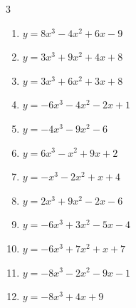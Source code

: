 \begin{multicols}{3}
\begin{enumerate}

  \item $y=8x^{3}-4x^{2}+6x-9$


  \item $y=3x^{3}+9x^{2}+4x+8$


  \item $y=3x^{3}+6x^{2}+3x+8$


\columnbreak %

  \item $y=-6x^{3}-4x^{2}-2x+1$


  \item $y=-4x^{3}-9x^{2}-6$


  \item $y=6x^{3}-x^{2}+9x+2$


  \item $y=-x^{3}-2x^{2}+x+4$


  \item $y=2x^{3}+9x^{2}-2x-6$


  \item $y=-6x^{3}+3x^{2}-5x-4$


  \item $y=-6x^{3}+7x^{2}+x+7$


  \item $y=-8x^{3}-2x^{2}-9x-1$


  \item $y=-8x^{3}+4x+9$



\end{enumerate}
\end{multicols}
